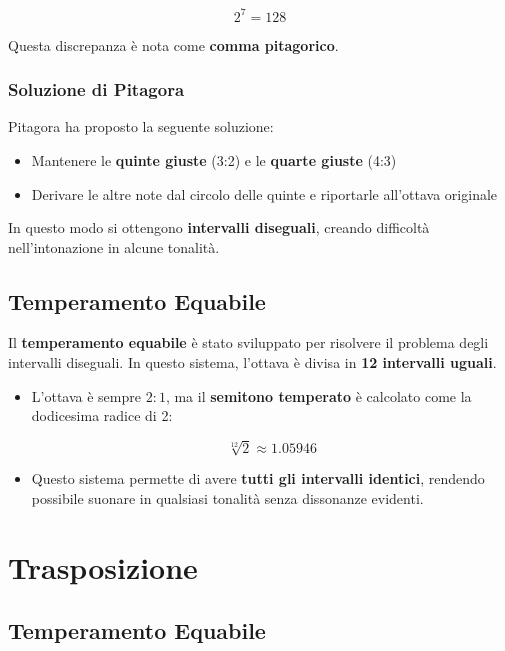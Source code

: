 \[
2^7 = 128
\]

Questa discrepanza è nota come \textbf{comma pitagorico}.

\subsubsection*{Soluzione di Pitagora}

Pitagora ha proposto la seguente soluzione:

\begin{itemize}
    \item Mantenere le \textbf{quinte giuste} (3:2) e le \textbf{quarte giuste} (4:3)
    \item Derivare le altre note dal circolo delle quinte e riportarle all'ottava originale
\end{itemize}

In questo modo si ottengono \textbf{intervalli diseguali}, creando difficoltà nell'intonazione in alcune tonalità.

\subsection*{Temperamento Equabile}

Il \textbf{temperamento equabile} è stato sviluppato per risolvere il problema degli intervalli diseguali. In questo sistema, l'ottava è divisa in \textbf{12 intervalli uguali}. 

\begin{itemize}
    \item L'ottava è sempre \( 2:1 \), ma il \textbf{semitono temperato} è calcolato come la dodicesima radice di 2:

    \[
    \sqrt[12]{2} \approx 1.05946
    \]

    \item Questo sistema permette di avere \textbf{tutti gli intervalli identici}, rendendo possibile suonare in qualsiasi tonalità senza dissonanze evidenti.
\end{itemize}

\section{Trasposizione}

\subsection*{Temperamento Equabile}

